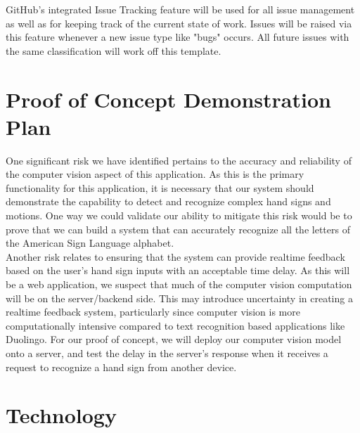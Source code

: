 \documentclass{article}
\begin{document}
GitHub's integrated Issue Tracking feature will be used for all issue management as well as for keeping track of the current state of work.  Issues will be raised via this feature whenever a new issue type like "bugs" occurs. All future issues with the same classification will work off this template.

\section{Proof of Concept Demonstration Plan}

One significant risk we have identified pertains to the accuracy and reliability of the computer vision aspect of this application. As this is the
primary functionality for this application, it is necessary that our system should demonstrate the capability to detect and recognize complex
hand signs and motions. One way we could validate our ability to mitigate this risk would be to prove that we can build a 
system that can accurately recognize all the letters of the American Sign Language alphabet.
\\

Another risk relates to ensuring that the system can provide realtime feedback based on the user's hand sign inputs with
an acceptable time delay. As this will be a web application, we suspect that much of the computer vision computation will be on the 
server/backend side. This may introduce uncertainty in creating a realtime feedback system, particularly since computer vision is more computationally
intensive compared to text recognition based applications like Duolingo. For our proof of concept, we will deploy our computer vision model
onto a server, and test the delay in the server's response when it receives a request to recognize a hand sign from another device.

\section{Technology}
\end{document}
